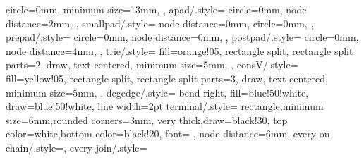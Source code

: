 {{      circle=0mm,
      minimum size=13mm,
    },
    apad/.style={
      circle=0mm, node distance=2mm,
    },
    smallpad/.style={
      node distance=0mm, circle=0mm,
    },
    prepad/.style={
      circle=0mm, node distance=0mm,
    },
    postpad/.style={
      circle=0mm, node distance=4mm,
    },
    trie/.style={
      fill=orange!05,
      rectangle split,
      rectangle split parts=2,
      draw,
      text centered,
      minimum size=5mm,
    },
    consV/.style={
      fill=yellow!05,
      rectangle split,
      rectangle split parts=3,
      draw,
      text centered,
      minimum size=5mm,
    },
    dcgedge/.style={
      bend right,
      fill=blue!50!white,
      draw=blue!50!white,
      line width=2pt
    }
    terminal/.style={
      rectangle,minimum size=6mm,rounded corners=3mm,
      very thick,draw=black!30,
      top color=white,bottom color=black!20,
      font=\ttfamily
    },
    node distance=6mm,
    every on chain/.style={},
    every join/.style=
}
